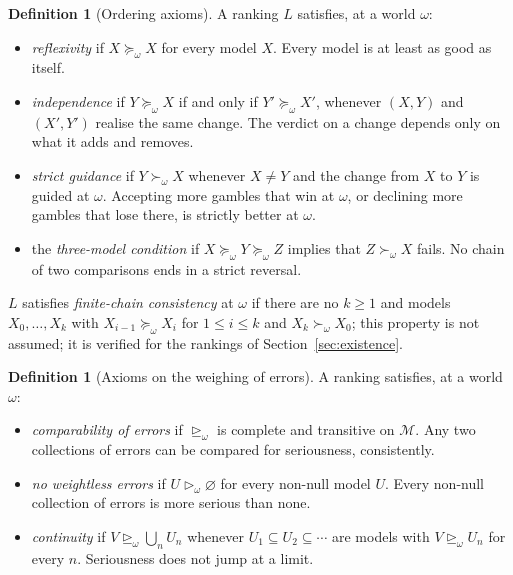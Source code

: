 \documentclass[11pt]{article}
\theoremstyle{definition}
\newtheorem{definition}[theorem]{Definition}
\newcommand{\M}{\mathcal M}
\newcommand{\sge}{\trianglerighteq}
\newcommand{\sgt}{\triangleright}
\begin{document}
\begin{definition}[Ordering axioms]\label{def:order}
A ranking $L$ satisfies, at a world $\omega$:
\begin{itemize}[leftmargin=*]
\item \emph{reflexivity} if $X\succeq_\omega X$ for every model $X$. Every model is at least as good as itself.
\item \emph{independence} if $Y\succeq_\omega X$ if and only if $Y'\succeq_\omega X'$, whenever $(X,Y)$ and $(X',Y')$ realise the same change. The verdict on a change depends only on what it adds and removes.
\item \emph{strict guidance} if $Y\succ_\omega X$ whenever $X\ne Y$ and the change from $X$ to $Y$ is guided at $\omega$. Accepting more gambles that win at $\omega$, or declining more gambles that lose there, is strictly better at $\omega$.
\item the \emph{three-model condition} if $X\succeq_\omega Y\succeq_\omega Z$ implies that $Z\succ_\omega X$ fails. No chain of two comparisons ends in a strict reversal.
\end{itemize}
$L$ satisfies \emph{finite-chain consistency} at $\omega$ if there are no $k\ge1$ and models $X_0,\dots,X_k$ with $X_{i-1}\succeq_\omega X_i$ for $1\le i\le k$ and $X_k\succ_\omega X_0$; this property is not assumed; it is verified for the rankings of Section~\ref{sec:existence}.
\end{definition}

\begin{definition}[Axioms on the weighing of errors]\label{def:weighing}
A ranking satisfies, at a world $\omega$:
\begin{itemize}[leftmargin=*]
\item \emph{comparability of errors} if $\sge_\omega$ is complete and transitive on $\M$. Any two collections of errors can be compared for seriousness, consistently.
\item \emph{no weightless errors} if $U\sgt_\omega\varnothing$ for every non-null model $U$. Every non-null collection of errors is more serious than none.
\item \emph{continuity} if $V\sge_\omega\bigcup_nU_n$ whenever $U_1\subseteq U_2\subseteq\cdots$ are models with $V\sge_\omega U_n$ for every $n$. Seriousness does not jump at a limit.
\end{itemize}
\end{definition}
\end{document}
